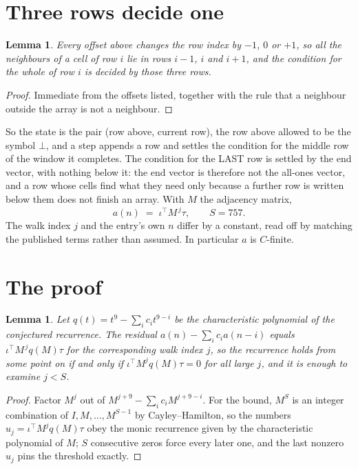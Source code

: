 \documentclass[11pt,a4paper]{article}
\theoremstyle{plain}
\newtheorem{lemma}[theorem]{Lemma}
\theoremstyle{definition}
\begin{document}
\section{Three rows decide one}

\begin{lemma}\label{lem:win}
Every offset above changes the row index by $-1$, $0$ or $+1$, so all the neighbours of a cell
of row $i$ lie in rows $i-1$, $i$ and $i+1$, and the condition for the whole of row $i$ is
decided by those three rows.
\end{lemma}

\begin{proof}
Immediate from the offsets listed, together with the rule that a neighbour outside the array is
not a neighbour.
\end{proof}

So the state is the pair (row above, current row), the row above allowed to be the symbol
$\bot$, and a step appends a row and settles the condition for the middle row of the window it
completes. The condition for the LAST row is settled by the end vector, with nothing below it:
the end vector is therefore not the all-ones vector, and a row whose cells find what they need
only because a further row is written below them does not finish an array. With $M$ the
adjacency matrix,
\[
a(n)\;=\;\iota^{\!\top}M^{\,j}\tau ,\qquad S=757.
\]
The walk index $j$ and the entry's own $n$ differ by a constant, read off by matching the
published terms rather than assumed. In particular $a$ is $C$-finite.

\section{The proof}

\begin{lemma}\label{lem:crit}
Let $q(t)=t^{9}-\sum_i c_it^{9-i}$ be the characteristic polynomial of the
conjectured recurrence. The residual $a(n)-\sum_ic_ia(n-i)$ equals
$\iota^{\!\top}M^{\,j}q(M)\tau$ for the corresponding walk index $j$, so the recurrence
holds from some point on if and only if $\iota^{\!\top}M^{j}q(M)\tau=0$ for all large $j$,
and it is enough to examine $j<S$.
\end{lemma}

\begin{proof}
Factor $M^{j}$ out of $M^{j+9}-\sum_ic_iM^{j+9-i}$. For the bound, $M^{S}$
is an integer combination of $I,M,\dots,M^{S-1}$ by Cayley--Hamilton, so the numbers
$u_j=\iota^{\!\top}M^{j}q(M)\tau$ obey the monic recurrence given by the characteristic
polynomial of $M$; $S$ consecutive zeros force every later one, and the last nonzero $u_j$
pins the threshold exactly.
\end{proof}
\end{document}
